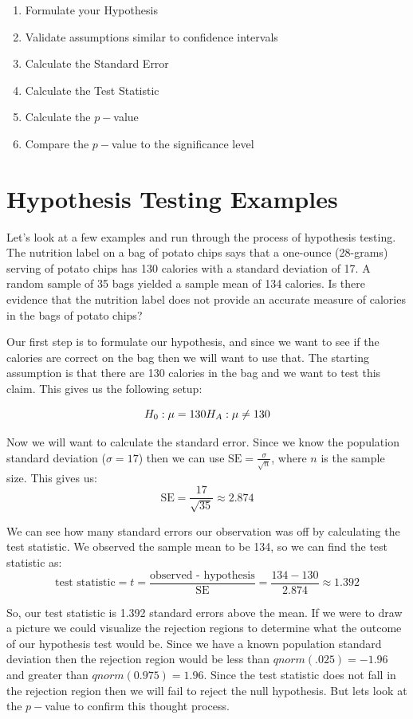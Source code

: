 \documentclass[
  letterpaper,
  DIV=11,
  numbers=noendperiod]{scrreprt}
\providecommand{\tightlist}{%
  \setlength{\itemsep}{0pt}\setlength{\parskip}{0pt}}
\begin{document}
\begin{enumerate}
\def\labelenumi{\arabic{enumi}.}
\tightlist
\item
  Formulate your Hypothesis
\item
  Validate assumptions similar to confidence intervals
\item
  Calculate the Standard Error
\item
  Calculate the Test Statistic
\item
  Calculate the \(p-\)value
\item
  Compare the \(p-\)value to the significance level
\end{enumerate}

\section{Hypothesis Testing Examples}\label{hypothesis-testing-examples}

Let's look at a few examples and run through the process of hypothesis
testing. The nutrition label on a bag of potato chips says that a
one-ounce (28-grams) serving of potato chips has 130 calories with a
standard deviation of 17. A random sample of 35 bags yielded a sample
mean of 134 calories. Is there evidence that the nutrition label does
not provide an accurate measure of calories in the bags of potato chips?

Our first step is to formulate our hypothesis, and since we want to see
if the calories are correct on the bag then we will want to use that.
The starting assumption is that there are 130 calories in the bag and we
want to test this claim. This gives us the following setup:

\[ H_0: \mu = 130 \\ H_A: \mu \neq 130\]

Now we will want to calculate the standard error. Since we know the
population standard deviation (\(\sigma = 17\)) then we can use
\(\text{SE}=\frac{\sigma}{\sqrt{n}}\), where \(n\) is the sample size.
This gives us: \[ \text{SE} = \frac{17}{\sqrt{35}} \approx 2.874 \]

We can see how many standard errors our observation was off by
calculating the test statistic. We observed the sample mean to be 134,
so we can find the test statistic as:
\[ \text{test statistic} = t = \frac{\text{observed - hypothesis}}{\text{SE}} = \frac{134-130}{2.874} \approx 1.392\]

So, our test statistic is 1.392 standard errors above the mean. If we
were to draw a picture we could visualize the rejection regions to
determine what the outcome of our hypothesis test would be. Since we
have a known population standard deviation then the rejection region
would be less than \(qnorm(.025)=-1.96\) and greater than
\(qnorm(0.975)=1.96\). Since the test statistic does not fall in the
rejection region then we will fail to reject the null hypothesis. But
lets look at the \(p-\)value to confirm this thought process.
\end{document}

